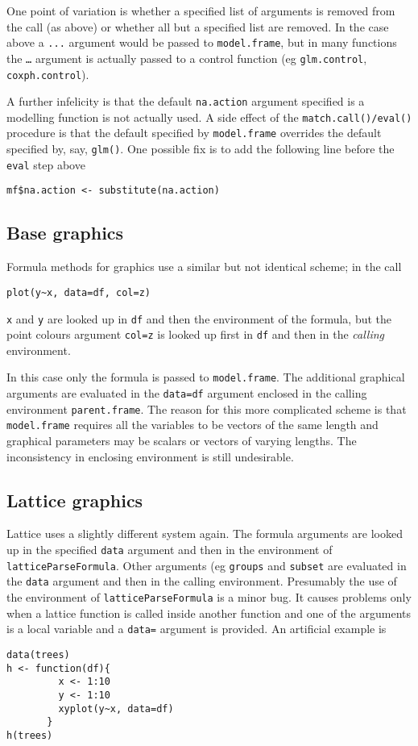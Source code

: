 \documentclass[11pt]{article}
\begin{document}
One point of variation is whether a specified list of arguments is removed from the call (as above) or whether all but a specified list are removed.  In the case above a \texttt{...} argument would be passed to \texttt{model.frame},  but in many 
functions the \texttt{\ldots} argument is actually passed to a control function (eg \texttt{glm.control}, \texttt{coxph.control}).

A further infelicity is that the default \texttt{na.action} argument specified is a modelling function is not actually used.  A side effect of the \texttt{match.call()/eval()} procedure is that the default specified by \texttt{model.frame} overrides the default specified by, say, \texttt{glm()}.  One possible fix is to add the following line before the \texttt{eval} step above
\begin{verbatim}
mf$na.action <- substitute(na.action)
\end{verbatim}


\subsection{Base graphics}
Formula methods for graphics use a similar but not identical scheme; in the call
\begin{verbatim}
plot(y~x, data=df, col=z)
\end{verbatim}
\texttt{x} and \texttt{y} are looked up in \texttt{df} and then the environment of the formula,  but the point colours argument \texttt{col=z} is looked up first in \texttt{df} and then in the \emph{calling} environment.  

In this case only the formula is passed to \texttt{model.frame}.  The additional graphical arguments are evaluated in the  \texttt{data=df} argument enclosed in the calling environment \texttt{parent.frame}.  The reason for this more complicated scheme is that \texttt{model.frame} requires all the variables to be vectors of the same length and graphical parameters may be scalars or vectors of varying lengths. The inconsistency in enclosing environment is still undesirable.


\subsection{Lattice graphics}
Lattice uses a slightly different system again.  The formula arguments are looked up in the specified \texttt{data} argument and then in the environment of \texttt{latticeParseFormula}. Other arguments (eg \texttt{groups} and \texttt{subset} are evaluated in the \texttt{data} argument and then in the calling environment.    Presumably the use of the environment of \texttt{latticeParseFormula} is a minor bug. It causes problems only when a lattice function is called inside another function and one of the arguments is a local variable and a \texttt{data=} argument is provided.  An artificial example is
\begin{verbatim}
data(trees)
h <- function(df){
         x <- 1:10
         y <- 1:10
         xyplot(y~x, data=df)
       }
h(trees)
\end{verbatim}
\end{document}
